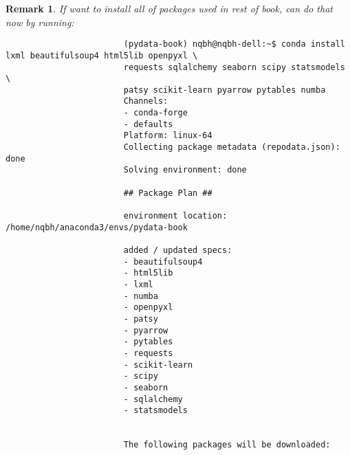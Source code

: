 \documentclass{article}
\newtheorem{remark}{Remark}
\begin{document}
\begin{enumerate}
\begin{itemize}
\begin{itemize}
\begin{itemize}
				\begin{remark}
					If want to install all of packages used in rest of book, can do that now by running:
					\begin{verbatim}
						(pydata-book) nqbh@nqbh-dell:~$ conda install lxml beautifulsoup4 html5lib openpyxl \
						requests sqlalchemy seaborn scipy statsmodels \
						patsy scikit-learn pyarrow pytables numba
						Channels:                                                                       
						- conda-forge                                                                  
						- defaults                                                                     
						Platform: linux-64                                                              
						Collecting package metadata (repodata.json): done                               
						Solving environment: done                                                       
						
						## Package Plan ##                                                              
						
						environment location: /home/nqbh/anaconda3/envs/pydata-book                   
						
						added / updated specs:                                                        
						- beautifulsoup4                                                            
						- html5lib                                                                  
						- lxml                                                                      
						- numba           
						- openpyxl
						- patsy
						- pyarrow
						- pytables
						- requests
						- scikit-learn
						- scipy
						- seaborn
						- sqlalchemy
						- statsmodels
						
						
						The following packages will be downloaded:
						

\end{verbatim}
\end{remark}
\end{itemize}
\end{itemize}
\end{itemize}
\end{enumerate}
\end{document}
